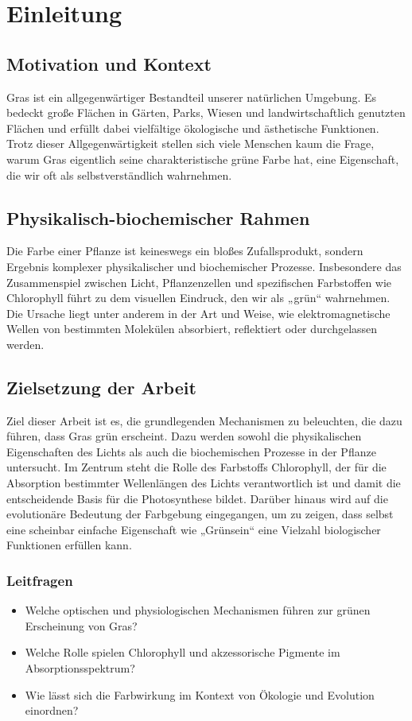 \chapter{Einleitung}

\section{Motivation und Kontext}
Gras ist ein allgegenwärtiger Bestandteil unserer natürlichen Umgebung. Es bedeckt große Flächen in Gärten, Parks, Wiesen und landwirtschaftlich genutzten Flächen und erfüllt dabei vielfältige ökologische und ästhetische Funktionen. Trotz dieser Allgegenwärtigkeit stellen sich viele Menschen kaum die Frage, warum Gras eigentlich seine charakteristische grüne Farbe hat, eine Eigenschaft, die wir oft als selbstverständlich wahrnehmen.

\section{Physikalisch-biochemischer Rahmen}
Die Farbe einer Pflanze ist keineswegs ein bloßes Zufallsprodukt, sondern Ergebnis komplexer physikalischer und biochemischer Prozesse. Insbesondere das Zusammenspiel zwischen Licht, Pflanzenzellen und spezifischen Farbstoffen wie Chlorophyll führt zu dem visuellen Eindruck, den wir als „grün“ wahrnehmen. Die Ursache liegt unter anderem in der Art und Weise, wie elektromagnetische Wellen von bestimmten Molekülen absorbiert, reflektiert oder durchgelassen werden.

\section{Zielsetzung der Arbeit}
Ziel dieser Arbeit ist es, die grundlegenden Mechanismen zu beleuchten, die dazu führen, dass Gras grün erscheint. Dazu werden sowohl die physikalischen Eigenschaften des Lichts als auch die biochemischen Prozesse in der Pflanze untersucht. Im Zentrum steht die Rolle des Farbstoffs Chlorophyll, der für die Absorption bestimmter Wellenlängen des Lichts verantwortlich ist und damit die entscheidende Basis für die Photosynthese bildet. Darüber hinaus wird auf die evolutionäre Bedeutung der Farbgebung eingegangen, um zu zeigen, dass selbst eine scheinbar einfache Eigenschaft wie „Grünsein“ eine Vielzahl biologischer Funktionen erfüllen kann.

\subsection{Leitfragen}
\begin{itemize}
  \item Welche optischen und physiologischen Mechanismen führen zur grünen Erscheinung von Gras?
  \item Welche Rolle spielen Chlorophyll und akzessorische Pigmente im Absorptionsspektrum?
  \item Wie lässt sich die Farbwirkung im Kontext von Ökologie und Evolution einordnen?
\end{itemize}

